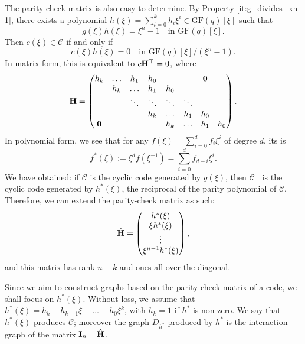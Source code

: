 \documentclass[a4paper, 11pt]{book}
\numberwithin{equation}{section}
\theoremstyle{plain}
\newcommand{\GF}{\mathrm{GF}}
\renewcommand{\(}{\ldbrack}
\renewcommand{\)}{\rdbrack}
\newcommand{\BF}[1]{{\bf\boldmath{#1}\unboldmath}}
\begin{document}
The parity-check matrix is also easy to determine. By Property \ref{it:g_divides_xn-1}, there exists a polynomial $h(\xi) = \sum_{i=0}^k h_i \xi^i \in \GF(q)[\xi]$ such that
\[
	g(\xi)h(\xi) = \xi^n - 1 \quad \text{in } \GF(q)[\xi].
\]
Then $c(\xi) \in \mathcal{C}$ if and only if
\[
	c(\xi) h(\xi) = 0 \quad \text{in } \GF(q)[\xi] / (\xi^n - 1).
\]
In matrix form, this is equivalent to $c {\bf H}^\top = 0$, where
\[
	{\bf H} = \begin{pmatrix}
	h_k		& \dots	& h_1 		& h_0		& 			& 			& {\bf 0}\\
			& h_k	& \dots		& h_1	 	& h_0 		& 			& 		& \\
			&    	& \ddots 	& \ddots 	& \ddots 	& \ddots 	& 		& \\
			& 		& 			& h_k		& \dots		& h_1		& h_0	& \\
	{\bf 0}	& 		& 			&			& h_k		& \dots		& h_1	& h_0 
	\end{pmatrix}.
\]
In polynomial form, we see that for any $f(\xi) = \sum_{i=0}^d f_i \xi^i$ of degree $d$, its \BF{reciprocal} is
\[
	f^*(\xi) := \xi^d f(\xi^{-1}) = \sum_{i=0}^d f_{d-i} \xi^i.
\]
We have obtained: if $\mathcal{C}$ is the cyclic code generated by $g(\xi)$, then $\mathcal{C}^\perp$ is the cyclic code generated by $h^*(\xi)$, the reciprocal of the parity polynomial of $\mathcal{C}$. Therefore, we can extend the parity-check matrix as such:
\[
	\hat{\bf H} = \begin{pmatrix}
	h^*(\xi)\\
	\xi h^*(\xi)\\
	\vdots\\
	\xi^{n-1} h^*(\xi)
	\end{pmatrix},
\]
and this matrix has rank $n - k$ and ones all over the diagonal.


Since we aim to construct graphs based on the parity-check matrix of a code, we shall focus on $h^*(\xi)$. Without loss, we assume that $h^*(\xi) = h_k + h_{k-1} \xi + \dots + h_0 \xi^k$, with $h_k = 1$ if $h^*$ is non-zero. We say that $h^*(\xi)$ produces $\mathcal{C}$; moreover the graph $D_{h^*}$ produced by $h^*$ is the interaction graph of the matrix ${\bf I}_n - \hat{\bf H}$.
\end{document}
